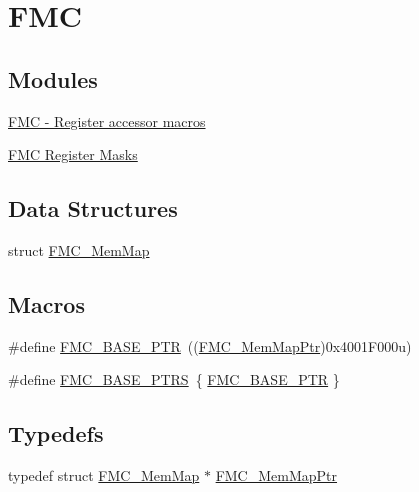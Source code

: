 \hypertarget{group___f_m_c___peripheral}{}\section{F\+M\+C}
\label{group___f_m_c___peripheral}
\subsection*{Modules}
\begin{DoxyCompactItemize}
\item 
\hyperlink{group___f_m_c___register___accessor___macros}{F\+M\+C -\/ Register accessor macros}
\item 
\hyperlink{group___f_m_c___register___masks}{F\+M\+C Register Masks}
\end{DoxyCompactItemize}
\subsection*{Data Structures}
\begin{DoxyCompactItemize}
\item 
struct \hyperlink{struct_f_m_c___mem_map}{F\+M\+C\+\_\+\+Mem\+Map}
\end{DoxyCompactItemize}
\subsection*{Macros}
\begin{DoxyCompactItemize}
\item 
\#define \hyperlink{group___f_m_c___peripheral_ga0a740437b573e32e6b932bf729485fd9}{F\+M\+C\+\_\+\+B\+A\+S\+E\+\_\+\+P\+T\+R}~((\hyperlink{group___f_m_c___peripheral_ga0552c12b8b29667270d15450ed977a6e}{F\+M\+C\+\_\+\+Mem\+Map\+Ptr})0x4001\+F000u)
\item 
\#define \hyperlink{group___f_m_c___peripheral_ga7ad26eb02eedda3bb7e2863700c32017}{F\+M\+C\+\_\+\+B\+A\+S\+E\+\_\+\+P\+T\+R\+S}~\{ \hyperlink{group___f_m_c___peripheral_ga0a740437b573e32e6b932bf729485fd9}{F\+M\+C\+\_\+\+B\+A\+S\+E\+\_\+\+P\+T\+R} \}
\end{DoxyCompactItemize}
\subsection*{Typedefs}
\begin{DoxyCompactItemize}
\item 
typedef struct \hyperlink{struct_f_m_c___mem_map}{F\+M\+C\+\_\+\+Mem\+Map} $\ast$ \hyperlink{group___f_m_c___peripheral_ga0552c12b8b29667270d15450ed977a6e}{F\+M\+C\+\_\+\+Mem\+Map\+Ptr}
\end{DoxyCompactItemize}


